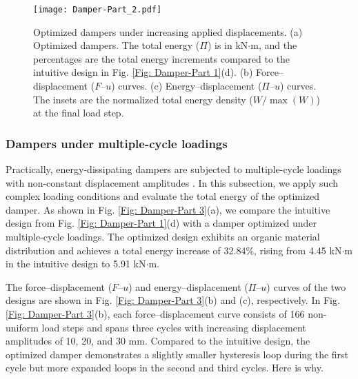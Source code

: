 \documentclass[preprint,11pt]{elsarticle}
\theoremstyle{definition}
\begin{document}
\begin{figure}[!htbp]
    \centering
    \texttt{[image: Damper-Part\_2.pdf]}
    \caption{Optimized dampers under increasing applied displacements. (a) Optimized dampers. The total energy ($\Pi$) is in kN$\cdot$m, and the percentages are the total energy increments compared to the intuitive design in Fig. \ref{Fig: Damper-Part 1}(d). (b) Force--displacement ($F$--$u$) curves. (c) Energy--displacement ($\Pi$--$u$) curves. The insets are the normalized total energy density ($W/\max(W)$) at the final load step.}
    \label{Fig: Damper-Part 2}
\end{figure}

\subsubsection{Dampers under multiple-cycle loadings}

Practically, energy-dissipating dampers are subjected to multiple-cycle loadings with non-constant displacement amplitudes \citep{zhang_simplified_2018, jia_novel_2019, jia_double_2021, jia_residual_2022}. In this subsection, we apply such complex loading conditions and evaluate the total energy of the optimized damper. As shown in Fig. \ref{Fig: Damper-Part 3}(a), we compare the intuitive design from Fig. \ref{Fig: Damper-Part 1}(d) with a damper optimized under multiple-cycle loadings. The optimized design exhibits an organic material distribution and achieves a total energy increase of 32.84\%, rising from 4.45 kN$\cdot$m in the intuitive design to 5.91 kN$\cdot$m.

The force--displacement ($F$--$u$) and energy--displacement ($\Pi$--$u$) curves of the two designs are shown in Fig. \ref{Fig: Damper-Part 3}(b) and (c), respectively. In Fig. \ref{Fig: Damper-Part 3}(b), each force--displacement curve consists of 166 non-uniform load steps and spans three cycles with increasing displacement amplitudes of 10, 20, and 30 mm. Compared to the intuitive design, the optimized damper demonstrates a slightly smaller hysteresis loop during the first cycle but more expanded loops in the second and third cycles. Here is why.
\end{document}

